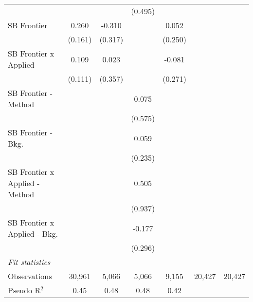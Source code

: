 \begin{tabular}{lcccccc}
                                  &          &               & (0.495)       &         &        &   \\   
   SB Frontier                    & 0.260    & -0.310        &               & 0.052   &        &   \\   
                                  & (0.161)  & (0.317)       &               & (0.250) &        &   \\   
   SB Frontier x Applied          & 0.109    & 0.023         &               & -0.081  &        &   \\   
                                  & (0.111)  & (0.357)       &               & (0.271) &        &   \\   
   SB Frontier - Method           &          &               & 0.075         &         &        &   \\   
                                  &          &               & (0.575)       &         &        &   \\   
   SB Frontier - Bkg.             &          &               & 0.059         &         &        &   \\   
                                  &          &               & (0.235)       &         &        &   \\   
   SB Frontier x Applied - Method &          &               & 0.505         &         &        &   \\   
                                  &          &               & (0.937)       &         &        &   \\   
   SB Frontier x Applied - Bkg.   &          &               & -0.177        &         &        &   \\   
                                  &          &               & (0.296)       &         &        &   \\   
   \midrule
   \emph{Fit statistics}\\
   Observations                   & 30,961   & 5,066         & 5,066         & 9,155   & 20,427 & 20,427\\  
   Pseudo R$^2$                   & 0.45     & 0.48          & 0.48          & 0.42    &        & \\  
   

\end{tabular}
